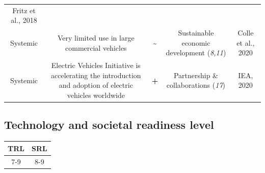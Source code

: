 \documentclass[
]{book}
\begin{document}
\begin{longtable}[]{@{}ccccc@{}}
\begin{minipage}[t]{0.17\columnwidth}
Fritz et al., 2018\strut
\end{minipage}\tabularnewline
\begin{minipage}[t]{0.17\columnwidth}\centering
Systemic\strut
\end{minipage} & \begin{minipage}[t]{0.16\columnwidth}\centering
Very limited use in large commercial vehicles\strut
\end{minipage} & \begin{minipage}[t]{0.17\columnwidth}\centering
\textbf{\textasciitilde{}}\strut
\end{minipage} & \begin{minipage}[t]{0.17\columnwidth}\centering
Sustainable economic development (\emph{8,11})\strut
\end{minipage} & \begin{minipage}[t]{0.17\columnwidth}\centering
Colle et al., 2020\strut
\end{minipage}\tabularnewline
\begin{minipage}[t]{0.17\columnwidth}\centering
Systemic\strut
\end{minipage} & \begin{minipage}[t]{0.16\columnwidth}\centering
Electric Vehicles Initiative is accelerating the introduction and adoption of electric vehicles worldwide\strut
\end{minipage} & \begin{minipage}[t]{0.17\columnwidth}\centering
\textbf{+}\strut
\end{minipage} & \begin{minipage}[t]{0.17\columnwidth}\centering
Partnership \& collaborations (\emph{17})\strut
\end{minipage} & \begin{minipage}[t]{0.17\columnwidth}\centering
IEA, 2020\strut
\end{minipage}\tabularnewline
\bottomrule
\end{longtable}

\hypertarget{technology-and-societal-readiness-level-27}{%
\subsection*{Technology and societal readiness level}\label{technology-and-societal-readiness-level-27}}

\begin{longtable}[]{@{}cc@{}}
\toprule
TRL & SRL\tabularnewline
\midrule
\endhead
7-9 & 8-9\tabularnewline
\bottomrule
\end{longtable}
\end{document}
